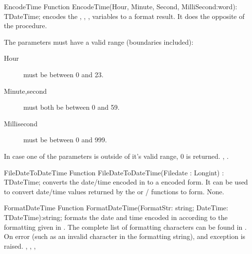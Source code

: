 \begin{function}{EncodeTime}
\Declaration
Function EncodeTime(Hour, Minute, Second, MilliSecond:word): TDateTime;
\Description
{} encodes the , , ,
 variables to a  format result.
It does the opposite of the  procedure.

The parameters must have a valid range (boundaries included):
\begin{description}
\item[Hour] must be between 0 and 23.
\item[Minute,second] must both be between 0 and 59.
\item[Millisecond] must be between 0 and 999.
\end{description}
\Errors
In case one of the parameters is outside of it's valid range, 0 is returned.
\SeeAlso
{}, .
\end{function}

\html{}

 
\begin{function}{FileDateToDateTime}
\Declaration
Function FileDateToDateTime(Filedate : Longint) : TDateTime;
\Description
{} converts the date/time encoded in 
to a  encoded form. It can be used to convert date/time values 
returned by the  or / 
functions to  form.
\Errors
None.
\SeeAlso
{}
\end{function}

\html{}
 
\begin{function}{FormatDateTime}
\Declaration
Function FormatDateTime(FormatStr: string; DateTime: TDateTime):string;
\Description
{} formats the date and time encoded in 
according to the formatting given in . The complete list 
of formatting characters can be found in .
\Errors
On error (such as an invalid character in the formatting string), and
 exception is raised.
\SeeAlso
{}, , ,
\end{function}

\html{}

